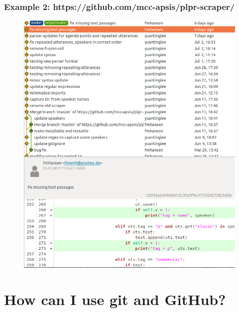 \documentclass{beamer}
\begin{document}
\begin{frame}
\frametitle{Example 2: https://github.com/mcc-apsis/plpr-scraper/}

\begin{figure}
	\includegraphics[width=0.8\linewidth]{images/plpr-scraper4.png}
\end{figure}

\end{frame}

\section{How can I use git and GitHub?}
\end{document}
